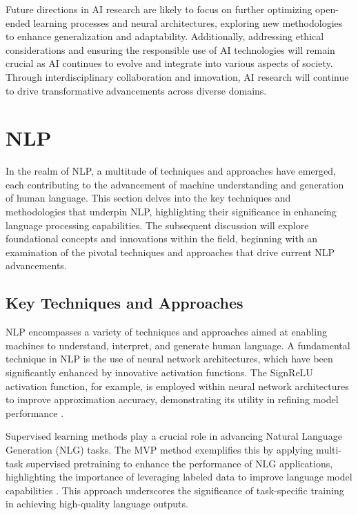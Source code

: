 Future directions in AI research are likely to focus on further optimizing open-ended learning processes and neural architectures, exploring new methodologies to enhance generalization and adaptability. Additionally, addressing ethical considerations and ensuring the responsible use of AI technologies will remain crucial as AI continues to evolve and integrate into various aspects of society. Through interdisciplinary collaboration and innovation, AI research will continue to drive transformative advancements across diverse domains.









\section{NLP} \label{sec:NLP}

In the realm of NLP, a multitude of techniques and approaches have emerged, each contributing to the advancement of machine understanding and generation of human language. This section delves into the key techniques and methodologies that underpin NLP, highlighting their significance in enhancing language processing capabilities. The subsequent discussion will explore foundational concepts and innovations within the field, beginning with an examination of the pivotal techniques and approaches that drive current NLP advancements.





\subsection{Key Techniques and Approaches} \label{subsec:Key Techniques and Approaches}



NLP encompasses a variety of techniques and approaches aimed at enabling machines to understand, interpret, and generate human language. A fundamental technique in NLP is the use of neural network architectures, which have been significantly enhanced by innovative activation functions. The SignReLU activation function, for example, is employed within neural network architectures to improve approximation accuracy, demonstrating its utility in refining model performance \cite{li2023signreluneuralnetworkapproximation}.



Supervised learning methods play a crucial role in advancing Natural Language Generation (NLG) tasks. The MVP method exemplifies this by applying multi-task supervised pretraining to enhance the performance of NLG applications, highlighting the importance of leveraging labeled data to improve language model capabilities \cite{tang2023mvpmultitasksupervisedpretraining}. This approach underscores the significance of task-specific training in achieving high-quality language outputs.



